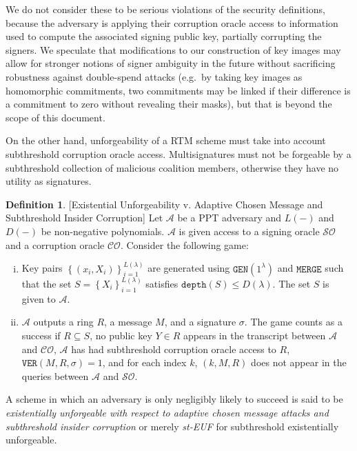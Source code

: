 \documentclass[12pt,english,oneside]{mrl}
\theoremstyle{definition}
\newtheorem{Defn}[lem]{Definition}
\newenvironment{defn}{\begin{Defn}\rm}{\end{Defn}}
\numberwithin{equation}{section}
\numberwithin{figure}{section}
\numberwithin{equation}{section}
\numberwithin{equation}{section}
\numberwithin{figure}{section}
\begin{document}
We do not consider these to be serious violations of the security definitions, because the adversary is applying their corruption oracle access to information used to compute the associated signing public key, partially corrupting the signers. We speculate that modifications to our construction of key images may allow for stronger notions of signer ambiguity in the future without sacrificing robustness against double-spend attacks (e.g.\ by taking key images as homomorphic commitments, two commitments may be linked if their difference is a commitment to zero without revealing their masks), but that is beyond the scope of this document.





On the other hand, unforgeability of a RTM scheme must take into account subthreshold corruption oracle access. Multisignatures must not be forgeable by a subthreshold collection of malicious coalition members, otherwise they have no utility as signatures.

\begin{defn}{[Existential Unforgeability v. Adaptive Chosen Message and Subthreshold Insider Corruption]} Let $\mathcal{A}$ be a PPT adversary and $L(-)$ and $D(-)$ be non-negative polynomials. $\mathcal{A}$ is given access to a signing oracle $\mathcal{SO}$ and a corruption oracle $\mathcal{CO}$. Consider the following game:

\begin{enumerate}[(i)]
\item Key pairs $\left\{(x_i, X_i)\right\}_{i=1}^{L(\lambda)}$ are generated using $\texttt{GEN}(1^\lambda)$ and $\texttt{MERGE}$ such that the set $S = \left\{X_i\right\}_{i=1}^{L(\lambda)}$ satisfies $\texttt{depth}(S) \leq D(\lambda)$. The set $S$ is given to $\mathcal{A}$.
\item $\mathcal{A}$ outputs a ring $R$, a message $M$, and a signature $\sigma$. The game counts as a success if $R \subseteq S$, no public key $Y \in R$ appears in the transcript between $\mathcal{A}$ and $\mathcal{CO}$, $\mathcal{A}$ has had subthreshold corruption oracle access to $R$, $\texttt{VER}(M,R,\sigma)=1$, and for each index $k$, $(k,M,R)$ does not appear in the queries between $\mathcal{A}$ and $\mathcal{SO}$.
\end{enumerate}
A scheme in which an adversary is only negligibly likely to succeed is said to be \textit{existentially unforgeable with respect to adaptive chosen message attacks and subthreshold insider corruption} or merely \textit{st-EUF} for subthreshold existentially unforgeable.
\end{defn}
\end{document}
